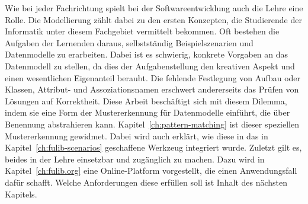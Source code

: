 Wie bei jeder Fachrichtung spielt bei der Softwareentwicklung auch die Lehre eine Rolle.
Die Modellierung zählt dabei zu den ersten Konzepten, die Studierende der Informatik unter diesem Fachgebiet vermittelt bekommen.
Oft bestehen die Aufgaben der Lernenden daraus, selbstständig Beispielszenarien und Datenmodelle zu erarbeiten.
Dabei ist es schwierig, konkrete Vorgaben an das Datenmodell zu stellen, da dies der Aufgabenstellung den kreativen Aspekt und einen wesentlichen Eigenanteil beraubt.
Die fehlende Festlegung von Aufbau oder Klassen, Attribut- und Assoziationsnamen erschwert andererseits das Prüfen von Lösungen auf Korrektheit.
Diese Arbeit beschäftigt sich mit diesem Dilemma, indem sie eine Form der Mustererkennung für Datenmodelle einführt, die über Benennung abstrahieren kann.
Kapitel~\ref{ch:pattern-matching} ist dieser speziellen Mustererkennung gewidmet.
Dabei wird auch erklärt, wie diese in das in Kapitel~\ref{ch:fulib-scenarios} geschaffene Werkzeug integriert wurde.
Zuletzt gilt es, beides in der Lehre einsetzbar und zugänglich zu machen.
Dazu wird in Kapitel~\ref{ch:fulib.org} eine Online-Platform vorgestellt, die einen Anwendungsfall dafür schafft.
Welche Anforderungen diese erfüllen soll ist Inhalt des nächsten Kapitels.
